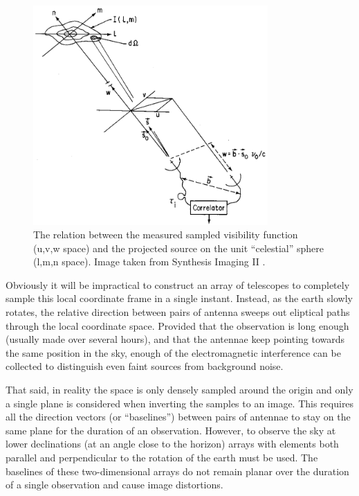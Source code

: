 \documentclass[a4paper, two column]{article}
\begin{document}
\begin{figure}[h]
 \begin{mdframed}
 \centering
 \includegraphics[width=0.8\textwidth]{lmn_uvw.png}
 \caption[The relation between image space and visibilities]{The relation between the measured sampled visibility function (u,v,w space) and the projected source on the unit ``celestial'' sphere (l,m,n space). Image taken from Synthesis Imaging II \cite{taylor1999synthesis}.}
  \label{FIG_APERTURE_SYNTH}
 \end{mdframed}
\end{figure}

Obviously it will be impractical to construct an array of telescopes to completely sample this local coordinate frame in a single instant. Instead, as the earth slowly rotates, the 
relative direction between pairs of antenna sweeps out eliptical paths through the local coordinate space. Provided that the observation is long enough (usually made over several hours), 
and that the antennae keep pointing towards the same position in the sky, enough of the electromagnetic interference can be collected to distinguish even faint sources from 
background noise.

That said, in reality the space is only densely sampled around the origin and only a single plane is considered when inverting the samples to an image. This requires all the direction 
vectors (or ``baselines'') between pairs of antennae to stay on the same plane for the duration of an observation. However, to observe the sky at lower declinations (at an angle close to
the horizon) arrays with elements both parallel and perpendicular to the rotation of the earth must be used. The baselines of these two-dimensional arrays do not remain planar over the duration
of a single observation and cause image distortions.
\end{document}

